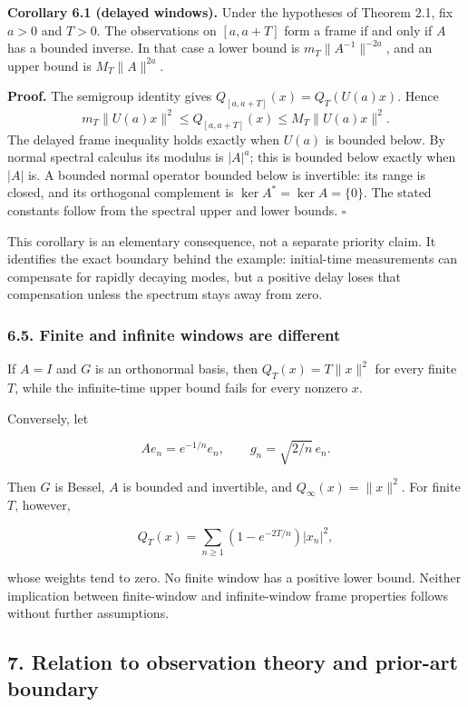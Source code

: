 \documentclass[
  11pt,
]{article}
\begin{document}
\textbf{Corollary 6.1 (delayed windows).} Under the hypotheses of
Theorem 2.1, fix \(a>0\) and \(T>0\). The observations on \([a,a+T]\)
form a frame if and only if \(A\) has a bounded inverse. In that case a
lower bound is \(m_T\|A^{-1}\|^{-2a}\), and an upper bound is
\(M_T\|A\|^{2a}\).

\textbf{Proof.} The semigroup identity gives
\(Q_{[a,a+T]}(x)=Q_T(U(a)x)\). Hence \[
m_T\|U(a)x\|^2\leq Q_{[a,a+T]}(x)\leq M_T\|U(a)x\|^2.
\] The delayed frame inequality holds exactly when \(U(a)\) is bounded
below. By normal spectral calculus its modulus is \(|A|^a\); this is
bounded below exactly when \(|A|\) is. A bounded normal operator bounded
below is invertible: its range is closed, and its orthogonal complement
is \(\ker A^*=\ker A=\{0\}\). The stated constants follow from the
spectral upper and lower bounds. \(\square\)

This corollary is an elementary consequence, not a separate priority
claim. It identifies the exact boundary behind the example: initial-time
measurements can compensate for rapidly decaying modes, but a positive
delay loses that compensation unless the spectrum stays away from zero.

\subsubsection{6.5. Finite and infinite windows are
different}\label{finite-and-infinite-windows-are-different}

If \(A=I\) and \(G\) is an orthonormal basis, then \(Q_T(x)=T\|x\|^2\)
for every finite \(T\), while the infinite-time upper bound fails for
every nonzero \(x\).

Conversely, let

\[
Ae_n=e^{-1/n}e_n,\qquad g_n=\sqrt{2/n}\,e_n.
\]

Then \(G\) is Bessel, \(A\) is bounded and invertible, and
\(Q_\infty(x)=\|x\|^2\). For finite \(T\), however,

\[
Q_T(x)=\sum_{n\geq1}(1-e^{-2T/n})|x_n|^2,
\]

whose weights tend to zero. No finite window has a positive lower bound.
Neither implication between finite-window and infinite-window frame
properties follows without further assumptions.

\subsection{7. Relation to observation theory and prior-art
boundary}\label{relation-to-observation-theory-and-prior-art-boundary}
\end{document}

